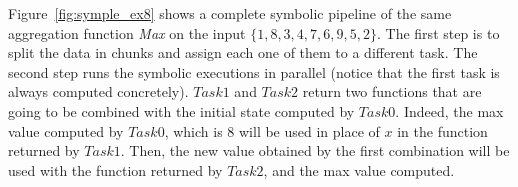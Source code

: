\begin{refsection}
Figure~\ref{fig:symple_ex8} shows a complete symbolic pipeline of the same
aggregation function \emph{Max} on the input $\{1, 8, 3, 4, 7, 6, 9, 5, 2\}$.
%
The first step is to split the data in chunks and assign each one of them to a
different task.
%
The second step runs the symbolic executions in parallel (notice that the
first task is always computed concretely).
%
$Task 1$ and $Task 2$ return two functions that are going to be combined with
the initial state computed by $Task 0$.
%
Indeed, the max value computed by $Task 0$, which is $8$ will be used in place
of $x$ in the function returned by $Task 1$.
%
Then, the new value obtained by the first combination will be used with the
function returned by $Task 2$, and the max value computed.



\end{refsection}
